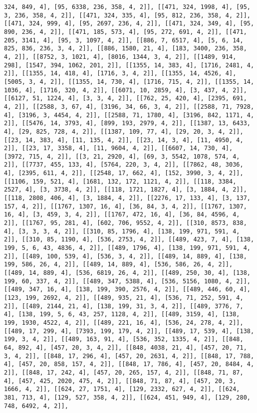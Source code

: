 \documentclass[12pt,fleqn]{article}\usepackage{../../common}
\begin{document}
\begin{verbatim}
324, 849, 4], [95, 6338, 236, 358, 4, 2]], [[471, 324, 1998, 4], [95, 3, 236, 358, 4, 2]], [[471, 324, 335, 4], [95, 812, 236, 358, 4, 2]], [[471, 324, 999, 4], [95, 2697, 236, 4, 2]], [[471, 324, 349, 4], [95, 890, 236, 4, 2]], [[471, 185, 573, 4], [95, 272, 691, 4, 2]], [[471, 205, 3141, 4], [95, 3, 1097, 4, 2]], [[886, 7, 6517, 4], [5, 6, 14, 825, 836, 236, 3, 4, 2]], [[886, 1580, 21, 4], [183, 3400, 236, 358, 4, 2]], [[8752, 3, 1021, 4], [8016, 1344, 3, 4, 2]], [[1489, 914, 298], [1547, 394, 1062, 201, 2]], [[1355, 14, 383, 4], [1716, 2481, 4, 2]], [[1355, 14, 418, 4], [1716, 3, 4, 2]], [[1355, 14, 4526, 4], [5005, 3, 4, 2]], [[1355, 14, 730, 4], [1716, 715, 4, 2]], [[1355, 14, 1036, 4], [1716, 320, 4, 2]], [[6071, 10, 2859, 4], [3, 437, 4, 2]], [[6127, 51, 1224, 4], [3, 3, 4, 2]], [[762, 25, 420, 4], [2395, 691, 4, 2]], [[2588, 3, 67, 4], [3196, 34, 66, 3, 4, 2]], [[2588, 71, 7928, 4], [3196, 3, 4454, 4, 2]], [[2588, 71, 1780, 4], [3196, 842, 1171, 4, 2]], [[5476, 14, 3793, 4], [899, 193, 2979, 4, 2]], [[1387, 13, 6433, 4], [29, 825, 728, 4, 2]], [[1387, 109, 77, 4], [29, 20, 3, 4, 2]], [[23, 14, 383, 4], [11, 135, 4, 2]], [[23, 14, 3, 4], [11, 4950, 4, 2]], [[23, 17, 3358, 4], [11, 9604, 4, 2]], [[6607, 14, 730, 4], [3972, 715, 4, 2]], [[3, 21, 2920, 4], [69, 3, 5542, 1078, 574, 4, 2]], [[7737, 455, 133, 4], [5764, 220, 3, 4, 2]], [[7862, 48, 3036, 4], [2395, 611, 4, 2]], [[2548, 17, 662, 4], [152, 3990, 3, 4, 2]], [[1106, 159, 521, 4], [1681, 132, 172, 1121, 4, 2]], [[118, 3384, 2527, 4], [3, 3738, 4, 2]], [[118, 1721, 1827, 4], [3, 1884, 4, 2]], [[118, 2808, 406, 4], [3, 1884, 4, 2]], [[2276, 17, 133, 4], [3, 137, 157, 4, 2]], [[1767, 1307, 16, 4], [36, 84, 3, 4, 2]], [[1767, 1307, 16, 4], [3, 459, 3, 4, 2]], [[1767, 472, 16, 4], [36, 84, 4596, 4, 2]], [[1767, 95, 281, 4], [602, 706, 9552, 4, 2]], [[310, 8573, 838, 4], [3, 3, 3, 4, 2]], [[310, 85, 1796, 4], [138, 199, 971, 591, 4, 2]], [[310, 85, 1190, 4], [536, 2753, 4, 2]], [[489, 423, 7, 4], [138, 199, 5, 6, 43, 4836, 4, 2]], [[489, 1796, 4], [138, 199, 971, 591, 4, 2]], [[489, 100, 539, 4], [536, 3, 4, 2]], [[489, 14, 889, 4], [138, 199, 586, 26, 4, 2]], [[489, 14, 889, 4], [536, 586, 26, 4, 2]], [[489, 14, 889, 4], [536, 6819, 26, 4, 2]], [[489, 250, 30, 4], [138, 199, 60, 337, 4, 2]], [[489, 347, 5388, 4], [536, 5156, 1080, 4, 2]], [[489, 347, 16, 4], [138, 199, 390, 2576, 4, 2]], [[489, 446, 60, 4], [123, 199, 2692, 4, 2]], [[489, 935, 21, 4], [536, 71, 252, 591, 4, 2]], [[489, 2144, 21, 4], [138, 199, 31, 3, 4, 2]], [[489, 3776, 7, 4], [138, 199, 5, 6, 43, 257, 1128, 4, 2]], [[489, 3159, 4], [138, 199, 1930, 4522, 4, 2]], [[489, 221, 16, 4], [536, 24, 278, 4, 2]], [[489, 17, 299, 4], [7393, 199, 179, 4, 2]], [[489, 17, 539, 4], [138, 199, 3, 4, 2]], [[489, 163, 91, 4], [536, 352, 1335, 4, 2]], [[848, 64, 892, 4], [457, 20, 3, 4, 2]], [[848, 4038, 21, 4], [457, 20, 71, 3, 4, 2]], [[848, 17, 296, 4], [457, 20, 2631, 4, 2]], [[848, 17, 788, 4], [457, 20, 858, 157, 4, 2]], [[848, 17, 786, 4], [457, 20, 8484, 4, 2]], [[848, 17, 242, 4], [457, 20, 265, 157, 4, 2]], [[848, 71, 87, 4], [457, 425, 2020, 475, 4, 2]], [[848, 71, 87, 4], [457, 20, 3, 1666, 4, 2]], [[624, 27, 1751, 4], [129, 2332, 627, 4, 2]], [[624, 381, 713, 4], [129, 527, 358, 4, 2]], [[624, 451, 949, 4], [129, 280, 748, 6492, 4, 2]], 
\end{verbatim}
\end{document}
